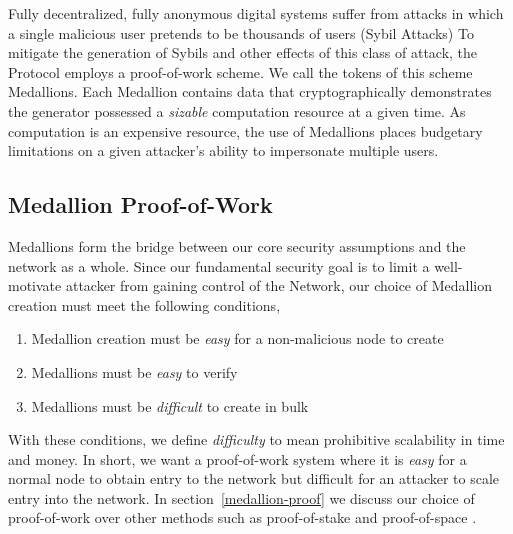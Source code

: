 
Fully decentralized, fully anonymous digital systems suffer from attacks in which a single malicious user pretends to be thousands of users (Sybil Attacks) 
To mitigate the generation of Sybils and other effects of this class of attack, the \Orchid{} Protocol employs a proof-of-work scheme. We call the tokens of this scheme Medallions. Each Medallion contains data that cryptographically demonstrates the generator possessed a \textit{sizable} computation resource at a given time. As
computation is an expensive resource, the use of Medallions places budgetary limitations on a given attacker's ability to impersonate multiple users.

\subsection{Medallion Proof-of-Work}
\label{medallion-pow}

Medallions form the bridge between our core security assumptions and the network as a whole. Since our fundamental security goal is to limit a well-motivate attacker from gaining control of the \Orchid{} Network, our choice of Medallion creation must meet the following conditions,
  \begin{enumerate}
      \item Medallion creation must be \textit{easy} for a non-malicious node to create
      \item Medallions  must be \textit{easy} to verify
      \item Medallions must be \textit{difficult} to create in bulk
  \end{enumerate}
With these conditions, we define \textit{difficulty} to mean prohibitive scalability in time and money. In short, we want a proof-of-work system where it is \textit{easy} for a normal node to obtain entry to the network but difficult for an attacker to scale entry into the network. 
In section~\ref{medallion-proof} we discuss our choice of proof-of-work over other methods such as proof-of-stake \cite{bentov2016snow, kiayias2017ouroboros, houy2014will} and proof-of-space \cite{dziembowski2015proofs, park2015spacecoin}.

